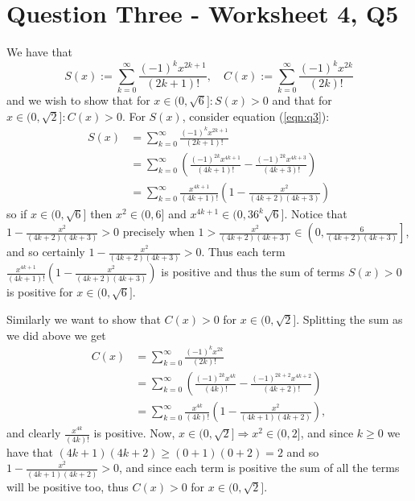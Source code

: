 \documentclass{article}
\begin{document}
\section*{Question Three - Worksheet 4, Q5}
We have that
	\begin{equation}\label{eqn:q3}
		S(x) := \sum_{k=0}^\infty \frac{(-1)^kx^{2k+1}}{(2k+1)!},\quad
		C(x) := \sum_{k=0}^\infty \frac{(-1)^kx^{2k}}{(2k)!}
	\end{equation}
and we wish to show that for $x\in(0,\sqrt{6}]: S(x)>0$ and that for $x\in(0,\sqrt{2}]: C(x)>0$. For $S(x)$, consider equation (\ref{eqn:q3}):
	\begin{align*}
		S(x) &= \sum_{k=0}^\infty \frac{(-1)^kx^{2k+1}}{(2k+1)!} \\
		&= \sum_{k=0}^\infty
			\left(
			\frac{(-1)^{2k}x^{4k+1}}{(4k+1)!} -
			\frac{(-1)^{2k}x^{4k+3}}{(4k+3)!}
			\right) \\
		&= \sum_{k=0}^\infty
			\frac{x^{4k+1}}{(4k+1)!}
			\left(
			1-\frac{x^2}{(4k+2)(4k+3)}
			\right)
	\end{align*}
so if $x\in(0,\sqrt{6}]$ then $x^2\in(0,6]$ and $x^{4k+1}\in(0,36^k\sqrt{6}]$. Notice that $1-\frac{x^2}{(4k+2)(4k+3)}>0$ precisely when $1>\frac{x^2}{(4k+2)(4k+3)}\in \left(0,\frac{6}{(4k+2)(4k+3)}\right]$, and so certainly $1-\frac{x^2}{(4k+2)(4k+3)}>0$. Thus each term $\frac{x^{4k+1}}{(4k+1)!} \left(1-\frac{x^2}{(4k+2)(4k+3)}\right)$ is positive and thus the sum of terms $S(x)>0$ is positive for $x\in(0,\sqrt{6}]$.

Similarly we want to show that $C(x)>0$ for $x\in(0,\sqrt{2}]$. Splitting the sum as we did above we get
	\begin{align*}
		C(x) &= \sum_{k=0}^\infty \frac{(-1)^kx^{2k}}{(2k)!} \\
		&= \sum_{k=0}^\infty 
			\left(
			\frac{(-1)^{2k}   x^{4k  }}{(4k)!} -
			\frac{(-1)^{2k+2} x^{4k+2}}{(4k+2)!}
			\right)\\
		&= \sum_{k=0}^\infty
			\frac{x^{4k}}{(4k)!}
			\left(
			1 - \frac{x^2}{(4k+1)(4k+2)}
			\right),
	\end{align*}
and clearly $\frac{x^{4k}}{(4k)!}$ is positive. Now, $x\in(0,\sqrt{2}] \Rightarrow x^2\in(0,2]$, and since $k\geq0$ we have that $(4k+1)(4k+2)\geq(0+1)(0+2)=2$ and so $1 - \frac{x^2}{(4k+1)(4k+2)}>0$, and since each term is positive the sum of all the terms will be positive too, thus $C(x)>0$ for $x\in(0,\sqrt{2}]$.
\end{document}
